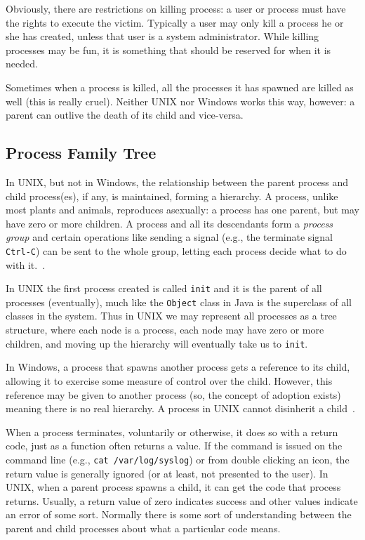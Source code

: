 \documentclass[a4paper]{report}
\begin{document}
Obviously, there are restrictions on killing process: a user or process must have the rights to execute the victim. Typically a user may only kill a process he or she has created, unless that user is a system administrator. While killing processes may be fun, it is something that should be reserved for when it is needed.

Sometimes when a process is killed, all the processes it has spawned are killed as well (this is really cruel). Neither UNIX nor Windows works this way, however: a parent can outlive the death of its child and vice-versa.

\subsection*{Process Family Tree}
In UNIX, but not in Windows, the relationship between the parent process and child process(es), if any, is maintained, forming a hierarchy. A process, unlike most plants and animals, reproduces asexually: a process has one parent, but may have zero or more children. A process and all its descendants form a \textit{process group} and certain operations like sending a signal (e.g., the terminate signal \texttt{Ctrl-C}) can be sent to the whole group, letting each process decide what to do with it.~\cite{mos}.

In UNIX the first process created is called \texttt{init} and it is the parent of all processes (eventually), much like the \texttt{Object} class in Java is the superclass of all classes in the system. Thus in UNIX we may represent all processes as a tree structure, where each node is a process, each node may have zero or more children, and moving up the hierarchy will eventually take us to \texttt{init}.

In Windows, a process that spawns another process gets a reference to its child, allowing it to exercise some measure of control over the child. However, this reference may be given to another process (so, the concept of adoption exists) meaning there is no real hierarchy. A process in UNIX cannot disinherit a child~\cite{mos}.

When a process terminates, voluntarily or otherwise, it does so with a return code, just as a function often returns a value. If the command is issued on the command line (e.g., \texttt{cat /var/log/syslog}) or from double clicking an icon, the return value is generally ignored (or at least, not presented to the user). In UNIX, when a parent process spawns a child, it can get the code that process returns. Usually, a return value of zero indicates success and other values indicate an error of some sort. Normally there is some sort of understanding between the parent and child processes about what a particular code means.
\end{document}
